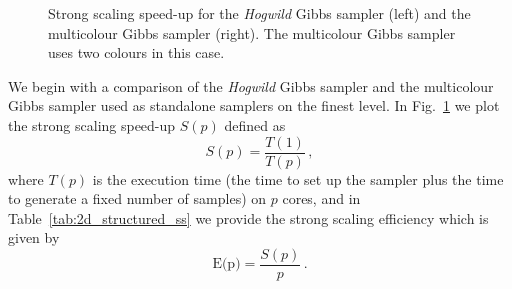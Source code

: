 \documentclass[
fontsize=11pt,
paper=a4,
numbers=noenddot
]{scrartcl}
\begin{document}
\begin{figure}[htbp]
\begin{subfigure}[b]{0.49\textwidth}
      \end{subfigure}
      \caption{Strong scaling speed-up for the \emph{Hogwild} Gibbs sampler (left) and the multicolour Gibbs sampler (right). The multicolour Gibbs sampler uses two colours in this case.}
    \label{fig:2d_structured_ss}
\end{figure}

We begin with a comparison of the \emph{Hogwild} Gibbs sampler and the multicolour Gibbs sampler used as standalone samplers on the finest level. In Fig.~\ref{fig:2d_structured_ss} we plot the strong scaling speed-up $S(p)$ defined as
\begin{equation*}
    S(p) = \frac{T(1)}{T(p)}\,,
\end{equation*}
where $T(p)$ is the execution time (the time to set up the sampler plus the time to generate a fixed number of samples) on $p$ cores, and in Table~\ref{tab:2d_structured_ss} we provide the strong scaling efficiency which is given by
\begin{equation*}
  \text{E(p)} = \frac{S(p)}{p}\,.
\end{equation*}
\end{document}
